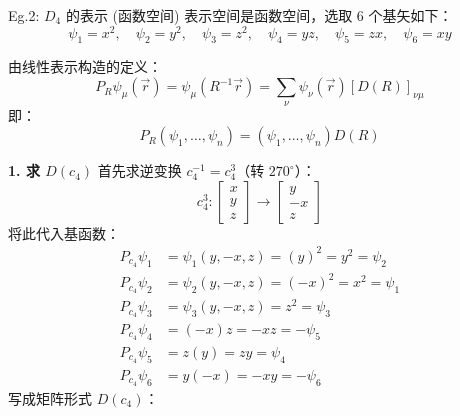 \begin{example}{Eg.2: $D_4$ 的表示 (函数空间)}
    表示空间是函数空间，选取 6 个基矢如下：
    \begin{equation}
        \psi_1=x^2, \quad \psi_2=y^2, \quad \psi_3=z^2, \quad \psi_4=yz, \quad \psi_5=zx, \quad \psi_6=xy
    \end{equation}
    
    由线性表示构造的定义：
    \begin{equation}
        P_R \psi_\mu(\vec{r}) = \psi_\mu(R^{-1}\vec{r}) = \sum_\nu \psi_\nu(\vec{r}) [D(R)]_{\nu\mu}
    \end{equation}
    即：
    \begin{equation}
        P_R (\psi_1, \dots, \psi_n) = (\psi_1, \dots, \psi_n) D(R)
    \end{equation}

    \textbf{1. 求 $D(c_4)$}
    首先求逆变换 $c_4^{-1} = c_4^3$（转 $270^\circ$）：
    \begin{equation}
        c_4^3: \begin{bmatrix} x \\ y \\ z \end{bmatrix} \to \begin{bmatrix} y \\ -x \\ z \end{bmatrix}
    \end{equation}
    将此代入基函数：
    \begin{equation}
        \begin{aligned}
            P_{c_4}\psi_1 &= \psi_1(y, -x, z) = (y)^2 = y^2 = \psi_2 \\
            P_{c_4}\psi_2 &= \psi_2(y, -x, z) = (-x)^2 = x^2 = \psi_1 \\
            P_{c_4}\psi_3 &= \psi_3(y, -x, z) = z^2 = \psi_3 \\
            P_{c_4}\psi_4 &= (-x)z = -xz = -\psi_5 \\
            P_{c_4}\psi_5 &= z(y) = zy = \psi_4 \\
            P_{c_4}\psi_6 &= y(-x) = -xy = -\psi_6
        \end{aligned}
    \end{equation}
    写成矩阵形式 $D(c_4)$：
   

\end{example}
